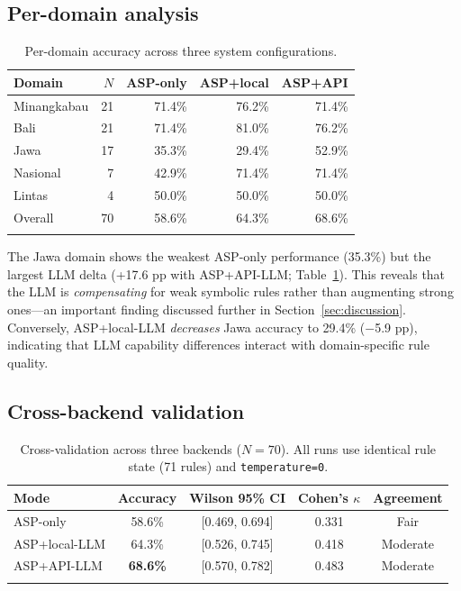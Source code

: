 \documentclass[pdflatex,sn-basic,Numbered]{sn-jnl}
\begin{document}
\subsection{Per-domain analysis}\label{subsec:domain}

\begin{table}[t]
\caption{Per-domain accuracy across three system configurations.}\label{tab:domain}
\begin{tabular*}{\textwidth}{@{\extracolsep\fill}lrrrr}
\toprule
Domain & $N$ & ASP-only & ASP+local & ASP+API \\
\midrule
Minangkabau & 21 & 71.4\% & 76.2\% & 71.4\% \\
Bali & 21 & 71.4\% & 81.0\% & 76.2\% \\
Jawa & 17 & 35.3\% & 29.4\% & 52.9\% \\
Nasional & 7 & 42.9\% & 71.4\% & 71.4\% \\
Lintas & 4 & 50.0\% & 50.0\% & 50.0\% \\
\midrule
Overall & 70 & 58.6\% & 64.3\% & 68.6\% \\
\botrule
\end{tabular*}
\end{table}

The Jawa domain shows the weakest ASP-only performance (35.3\%) but the largest LLM delta (+17.6 pp with ASP+API-LLM; Table~\ref{tab:domain}).
This reveals that the LLM is \textit{compensating} for weak symbolic rules rather than augmenting strong ones---an important finding discussed further in Section~\ref{sec:discussion}.
Conversely, ASP+local-LLM \textit{decreases} Jawa accuracy to 29.4\% ($-$5.9 pp), indicating that LLM capability differences interact with domain-specific rule quality.

\subsection{Cross-backend validation}\label{subsec:crossval}

\begin{table}[t]
\caption{Cross-validation across three backends ($N=70$). All runs use identical rule state (71 rules) and \texttt{temperature=0}.}\label{tab:crossval}
\begin{tabular*}{\textwidth}{@{\extracolsep\fill}lcccc}
\toprule
Mode & Accuracy & Wilson 95\% CI & Cohen's $\kappa$ & Agreement \\
\midrule
ASP-only & 58.6\% & [0.469, 0.694] & 0.331 & Fair \\
ASP+local-LLM & 64.3\% & [0.526, 0.745] & 0.418 & Moderate \\
ASP+API-LLM & \textbf{68.6\%} & [0.570, 0.782] & 0.483 & Moderate \\
\botrule
\end{tabular*}
\end{table}
\end{document}
